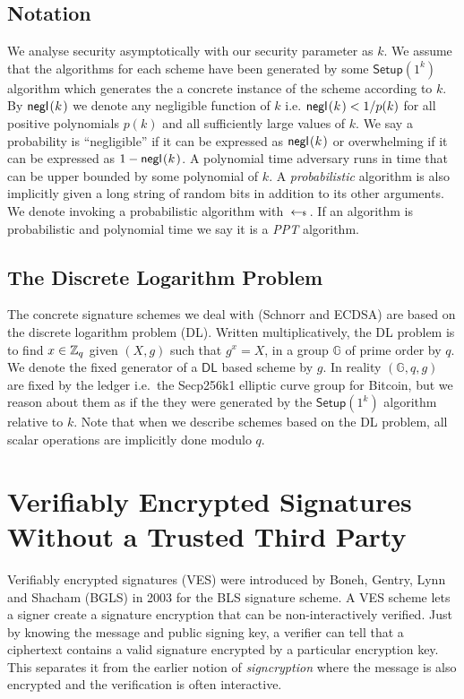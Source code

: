 \documentclass[fullpage]{article}
\theoremstyle{definition}
\newcommand{\G}{\mathbb{G}}
\newcommand{\DLOG}{\textsf{DL}\xspace}
\begin{document}
\subsection{Notation}
We analyse security asymptotically with our security parameter as $k$. We assume that the algorithms for each scheme have been generated by some $\textsf{Setup}(1^k)$ algorithm which generates the a concrete instance of the scheme according to $k$. By $\negl[k]$ we denote any negligible function of $k$ i.e.  $\negl[k] < 1/p(k)$  for all positive polynomials $p(k)$ and all sufficiently large values of $k$. We say a probability is ``negligible'' if it can be expressed as $\negl[k]$ or overwhelming if it can be expressed as $1 - \negl[k]$.  A polynomial time adversary runs in time that can be upper bounded by some polynomial of $k$. A \emph{probabilistic} algorithm is also implicitly given a long string of random bits in addition to its other arguments. We denote invoking a probabilistic algorithm with $\hskip2.3pt{\gets\!\!\mbox{\tiny${\$}$\normalsize}}\,$. If an algorithm is probabilistic and polynomial time we say it is a \emph{PPT} algorithm.

\subsection{The Discrete Logarithm Problem}

The concrete signature schemes we deal with (Schnorr and ECDSA) are based on the discrete logarithm problem (\DLOG). Written multiplicatively, the \DLOG problem is to find $x \in \mathbb{Z}_q$ given $(X,g)$ such that $g^x = X$, in a group $\G$ of prime order by $q$. We denote the fixed generator of a $\DLOG$ based scheme by $g$. In reality $(\G,q,g)$ are fixed by the ledger i.e.\ the Secp256k1 elliptic curve group for Bitcoin, but we reason about them as if the they were generated by the $\textsf{Setup}(1^k)$ algorithm relative to $k$. Note that when we describe schemes based on the \DLOG problem, all scalar operations are implicitly done modulo $q$.



\section{Verifiably Encrypted Signatures Without a Trusted Third Party}
\label{VES-section}

Verifiably encrypted signatures (VES) were introduced by Boneh, Gentry, Lynn and Shacham (BGLS) \cite{Boneh:2003:AVE:1766171.1766207} in 2003 for the BLS signature scheme\cite{Boneh:2001:SSW:647097.717005}. A VES scheme lets a signer create a signature encryption that can be non-interactively verified. Just by knowing the message and public signing key, a verifier can tell that a ciphertext contains a valid signature encrypted by a particular encryption key. This separates it from the earlier notion of \emph{signcryption}\cite{signcryption-book} where the message is also encrypted and the verification is often interactive.
\end{document}
